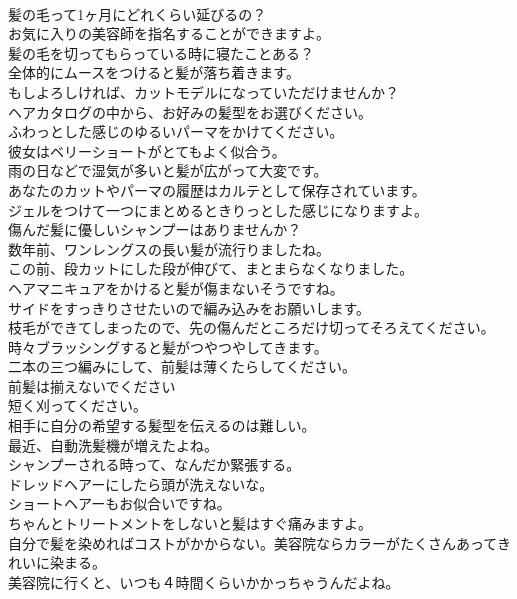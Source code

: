 \documentclass[8pt]{extreport}
\begin{document}
\begin{CJK}{UTF8}{min}
\\	髪の毛って1ヶ月にどれくらい延びるの？	
\\	お気に入りの美容師を指名することができますよ。	
\\	髪の毛を切ってもらっている時に寝たことある？	
\\	全体的にムースをつけると髪が落ち着きます。	
\\	もしよろしければ、カットモデルになっていただけませんか？	
\\	ヘアカタログの中から、お好みの髪型をお選びください。	
\\	ふわっとした感じのゆるいパーマをかけてください。	
\\	彼女はベリーショートがとてもよく似合う。	
\\	雨の日などで湿気が多いと髪が広がって大変です。	
\\	あなたのカットやパーマの履歴はカルテとして保存されています。	
\\	ジェルをつけて一つにまとめるときりっとした感じになりますよ。	
\\	傷んだ髪に優しいシャンプーはありませんか？	
\\	数年前、ワンレングスの長い髪が流行りましたね。	
\\	この前、段カットにした段が伸びて、まとまらなくなりました。	
\\	ヘアマニキュアをかけると髪が傷まないそうですね。	
\\	サイドをすっきりさせたいので編み込みをお願いします。	
\\	枝毛ができてしまったので、先の傷んだところだけ切ってそろえてください。	
\\	時々ブラッシングすると髪がつやつやしてきます。	
\\	二本の三つ編みにして、前髪は薄くたらしてください。	
\\	前髪は揃えないでください	
\\	短く刈ってください。	
\\	相手に自分の希望する髪型を伝えるのは難しい。	
\\	最近、自動洗髪機が増えたよね。	
\\	シャンプーされる時って、なんだか緊張する。	
\\	ドレッドヘアーにしたら頭が洗えないな。	
\\	ショートヘアーもお似合いですね。	
\\	ちゃんとトリートメントをしないと髪はすぐ痛みますよ。	
\\	自分で髪を染めればコストがかからない。美容院ならカラーがたくさんあってきれいに染まる。	
\\	美容院に行くと、いつも４時間くらいかかっちゃうんだよね。	

\end{CJK}
\end{document}
